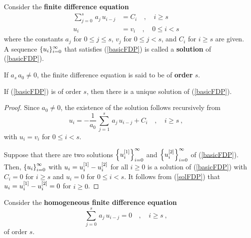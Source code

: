 \begin{defn}
Consider the
{\bfseries finite difference equation}
\begin{equation}  \label{basicFDP}
\begin{split}
\sum_{j=0}^s\,a_j\,u_{i-j} &= C_i \quad, \quad i \geq s \\
u_i &= v_i \quad, \quad 0 \leq i < s
\end{split}
\end{equation}
where the constants $a_j$ for $0\leq j \leq s$, $v_j$ for
$0 \leq j < s$, and $C_i$ for $i\geq s$ are given.
A sequence $\displaystyle \{ u_i \}_{i=0}^\infty$ that satisfies
(\ref{basicFDP}) is called a
{\bfseries solution} of
(\ref{basicFDP}).

If $a_s\,a_0 \neq 0$, the finite difference equation is said to be of
{\bfseries order} $s$.
\end{defn}

\begin{theorem}
If (\ref{basicFDP}) is of order $s$, then there is a unique solution
of (\ref{basicFDP}).
\end{theorem}

\begin{proof}
Since $a_0 \neq 0$, the existence of the solution follows recursively from
\begin{equation} \label{solFDP}
u_i = -\frac{1}{a_0} \, \sum_{j=1}^s\,a_j\,u_{i-j} 
+ C_i \quad, \quad i \geq s \ ,
\end{equation}
with $u_i = v_i$ for $0 \leq i < s$.

Suppose that there are two solutions
$\displaystyle \left\{ u_i^{[1]} \right\}_{i=0}^\infty$ and
$\displaystyle \left\{u_i^{[2]} \right\}_{i=0}^\infty$ of
(\ref{basicFDP}).  Then,
$\displaystyle \left\{ u_i \right\}_{i=0}^\infty$ with
$\displaystyle u_i = u_i^{[1]} - u_i^{[2]}$ for all $i\geq 0$ is a solution of
(\ref{basicFDP}) with $C_i = 0$ for $i\geq s$ and $u_i = 0$ for
$0 \leq i < s$.  It follows from (\ref{solFDP}) that
$\displaystyle u_i = u_i^{[1]} - u_i^{[2]} = 0$ for $i\geq 0$.
\end{proof}

Consider the {\bfseries homogeneous finite difference
equation}
\begin{equation} \label{homFDP}
\sum_{j=0}^s\,a_j\,u_{i-j} = 0 \quad, \quad i \geq s \ ,
\end{equation}
of order $s$.

